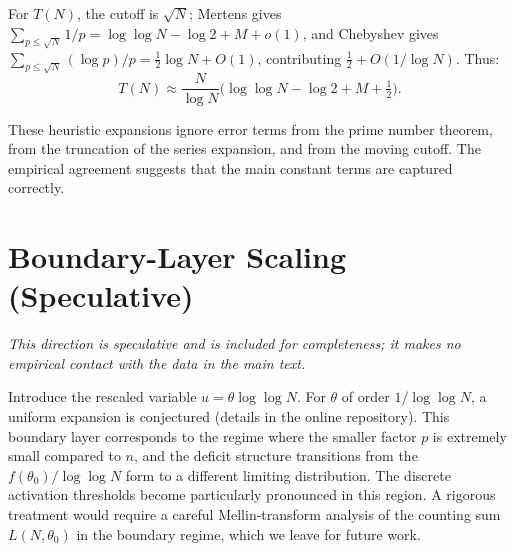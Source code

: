\documentclass[11pt]{article}
\theoremstyle{definition}
\begin{document}
For \(T(N)\), the cutoff is \(\sqrt{N}\); Mertens gives
\(\sum_{p \le \sqrt{N}} 1/p = \log\log N - \log 2 + M + o(1)\),
and Chebyshev gives \(\sum_{p \le \sqrt{N}} (\log p)/p = \tfrac12\log N + O(1)\),
contributing \(\tfrac12 + O(1/\log N)\).  Thus:
\[
T(N) \approx \frac{N}{\log N}
\bigl(\log\log N - \log 2 + M + \tfrac{1}{2}\bigr).
\]

These heuristic expansions ignore error terms from the prime number theorem, from
the truncation of the series expansion, and from the moving cutoff.  The empirical
agreement suggests that the main constant terms are captured correctly.

\section{Boundary-Layer Scaling (Speculative)}
\label{app:boundary}

\emph{This direction is speculative and is included for completeness; it makes
no empirical contact with the data in the main text.}

Introduce the rescaled variable \(u = \theta \log\log N\).  For \(\theta\) of order
\(1/\log\log N\), a uniform expansion is conjectured (details in the online
repository).  This boundary layer corresponds to the regime where the smaller factor
\(p\) is extremely small compared to \(n\), and the deficit structure transitions from
the \(f(\theta_0)/\log\log N\) form to a different limiting distribution.  The
discrete activation thresholds become particularly pronounced in this region.  A
rigorous treatment would require a careful Mellin-transform analysis of the counting
sum \(L(N,\theta_0)\) in the boundary regime, which we leave for future work.
\end{document}
